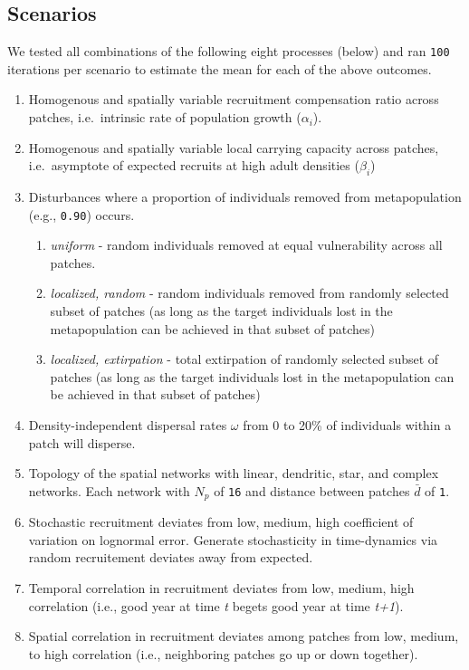 \documentclass[
]{article}
\providecommand{\tightlist}{%
  \setlength{\itemsep}{0pt}\setlength{\parskip}{0pt}}
\begin{document}
\hypertarget{scenarios}{%
\subsection{Scenarios}\label{scenarios}}

We tested all combinations of the following eight processes (below) and
ran \texttt{100} iterations per scenario to estimate the mean for each
of the above outcomes.

\begin{enumerate}
\def\labelenumi{\arabic{enumi}.}
\item
  Homogenous and spatially variable recruitment compensation ratio
  across patches, i.e.~intrinsic rate of population growth
  (\(\alpha_i\)).
\item
  Homogenous and spatially variable local carrying capacity across
  patches, i.e.~asymptote of expected recruits at high adult densities
  (\(\beta_i\))
\item
  Disturbances where a proportion of individuals removed from
  metapopulation (e.g., \texttt{0.90}) occurs.

  \begin{enumerate}
  \def\labelenumii{\alph{enumii}.}
  \tightlist
  \item
    \emph{uniform} - random individuals removed at equal vulnerability
    across all patches.
  \item
    \emph{localized, random} - random individuals removed from randomly
    selected subset of patches (as long as the target individuals lost
    in the metapopulation can be achieved in that subset of patches)
  \item
    \emph{localized, extirpation} - total extirpation of randomly
    selected subset of patches (as long as the target individuals lost
    in the metapopulation can be achieved in that subset of patches)
  \end{enumerate}
\item
  Density-independent dispersal rates \(\omega\) from 0 to 20\% of
  individuals within a patch will disperse.
\item
  Topology of the spatial networks with linear, dendritic, star, and
  complex networks. Each network with \(N_p\) of \texttt{16} and
  distance between patches \(\bar{d}\) of \texttt{1}.
\item
  Stochastic recruitment deviates from low, medium, high coefficient of
  variation on lognormal error. Generate stochasticity in time-dynamics
  via random recruitement deviates away from expected.
\item
  Temporal correlation in recruitment deviates from low, medium, high
  correlation (i.e., good year at time \emph{t} begets good year at time
  \emph{t+1}).
\item
  Spatial correlation in recruitment deviates among patches from low,
  medium, to high correlation (i.e., neighboring patches go up or down
  together).
\end{enumerate}
\end{document}
